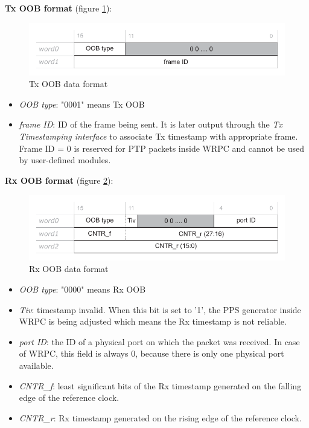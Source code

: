 {\bf Tx OOB format} (figure \ref{fig:fabric_adv:tx_oob}):

\begin{figure}[ht]
  \begin{center}
    \includegraphics[width=.7\textwidth]{fig/oob_tx.pdf}
    \caption{Tx OOB data format}
    \label{fig:fabric_adv:tx_oob}
  \end{center}
\end{figure}

\begin{itemize}
  \item[] \emph{OOB type}: "0001" means Tx OOB
  \item[] \emph{frame ID}: ID of the frame being sent. It is later output
    through the \emph{Tx Timestamping interface} to associate Tx timestamp with
    appropriate frame. Frame ID = 0 is reserved for PTP packets inside WRPC
    and cannot be used by user-defined modules.
\end{itemize}

{\bf Rx OOB format} (figure \ref{fig:fabric_adv:rx_oob}):
\begin{figure}[ht]
  \begin{center}
    \includegraphics[width=.7\textwidth]{fig/oob_rx.pdf}
    \caption{Rx OOB data format}
    \label{fig:fabric_adv:rx_oob}
  \end{center}
\end{figure}

\begin{itemize}
  \item[] \emph{OOB type}: "0000" means Rx OOB
  \item[] \emph{Tiv}: timestamp invalid. When this bit is set to '1', the PPS
    generator inside WRPC is being adjusted which means the Rx timestamp is not
    reliable.
  \item[] \emph{port ID}: the ID of a physical port on which the packet was
    received. In case of WRPC, this field is always 0, because there is only one
    physical port available.
  \item[] \emph{CNTR\_f}: least significant bits of the Rx timestamp generated on
    the falling edge of the reference clock.
  \item[] \emph{CNTR\_r}: Rx timestamp generated on the rising edge of the reference
    clock.
\end{itemize}
